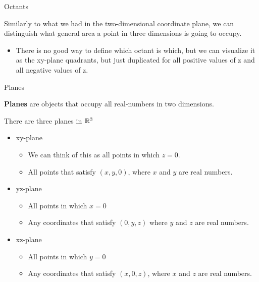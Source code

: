 \documentclass{report}
\begin{document}
\begin{sloppypar}
\begin{definition}
  Octants
\end{definition}
Similarly to what we had in the two-dimensional
coordinate plane, we can distinguish what
general area a point in three dimensions is
going to occupy.
\begin{itemize}
  \item There is no good way to define
        which octant is which, but we can
        visualize it as the xy-plane quadrants,
        but just duplicated for all positive
        values of z and all negative values of
        z.
\end{itemize}
\begin{definition}
  Planes
\end{definition}
\textbf{Planes} are objects that occupy
all real-numbers in two dimensions.
\par There are three planes in $ \mathbb{R}^{3} $
\begin{itemize}
  \item xy-plane
        \begin{itemize}
          \item We can think of this as
                all points in which $ z = 0 $.
          \item All  points
                that satisfy $ (x, y, 0) $,
                where $ x $ and $ y $ are
                real numbers.
        \end{itemize}

  \item yz-plane
        \begin{itemize}
          \item All points in which $ x = 0 $
          \item Any coordinates that satisfy
                $ (0, y , z )$ where
                $ y $ and $ z $ are
                real numbers.

        \end{itemize}
  \item xz-plane
        \begin{itemize}
          \item All points in which $ y = 0 $
          \item Any coordinates that
                satisfy $ (x, 0, z)$, where
                $ x $ and $ z $ are real
                numbers.

        \end{itemize}

\end{itemize}


\end{sloppypar}
\end{document}
